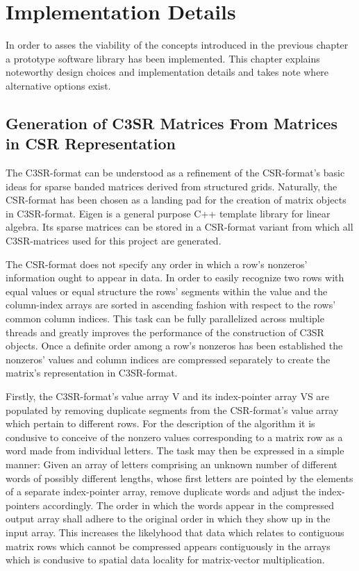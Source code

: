\def\ApiHubMlf{http://eigen.tuxfamily.org/index.php?title=Main_Page}

\chapter{Implementation Details}

  In order to asses the viability of the concepts introduced in the previous chapter a prototype software library has
  been implemented. This chapter explains noteworthy design choices and implementation details and takes note where
  alternative options exist.

  \section{Generation of C3SR Matrices From Matrices in CSR Representation} \label{sec:gen-of-c3sr-from-csr}

    The C3SR-format can be understood as a refinement of the CSR-format's basic ideas for sparse banded matrices derived
    from structured grids. Naturally, the CSR-format has been chosen as a landing pad for the creation of matrix objects
    in C3SR-format. Eigen \cite{eigen:website} is a general purpose C++ template library for linear algebra. Its sparse
    matrices can be stored in a CSR-format variant from which all C3SR-matrices used for this project are generated.

    The CSR-format does not specify any order in which a row's nonzeros' information ought to appear in data. In order
    to easily recognize two rows with equal values or equal structure the rows' segments within the value and the
    column-index arrays are sorted in ascending fashion with respect to the rows' common column indices. This task can
    be fully parallelized across multiple threads and greatly improves the performance of the construction of C3SR
    objects. Once a definite order among a row's nonzeros has been established the nonzeros' values and column indices
    are compressed separately to create the matrix's representation in C3SR-format.

    Firstly, the C3SR-format's value array V and its index-pointer array VS are populated by removing duplicate segments
    from the CSR-format's value array which pertain to different rows. For the description of the algorithm it is
    condusive to conceive of the nonzero values corresponding to a matrix row as a word made from individual letters.
    The task may then be expressed in a simple manner: Given an array of letters comprising an unknown number of
    different words of possibly different lengths, whose first letters are pointed by the elements of a separate
    index-pointer array, remove duplicate words and adjust the index-pointers accordingly. The order in which the words
    appear in the compressed output array shall adhere to the original order in which they show up in the input array.
    This increases the likelyhood that data which relates to contiguous matrix rows which cannot be compressed appears
    contiguously in the arrays which is condusive to spatial data locality for matrix-vector multiplication.

